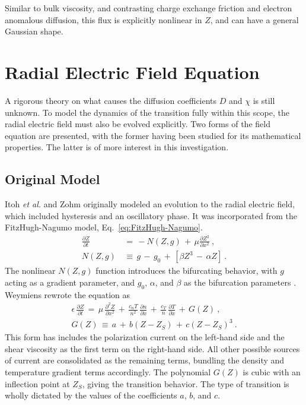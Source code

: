 Similar to bulk viscosity, and contrasting charge exchange friction and electron anomalous diffusion, this flux is explicitly nonlinear in $Z$, and can have a general Gaussian shape.


\section{Radial Electric Field Equation}\label{sec:Z_equation}
A rigorous theory on what causes the diffusion coefficients $D$ and $\chi$ is still unknown.
To model the dynamics of the transition fully within this scope, the radial electric field must also be evolved explicitly.
Two forms of the field equation are presented, with the former having been studied for its mathematical properties. The latter is of more interest in this investigation.

\subsection{Original Model}\label{ssec:original_Z_equation}
Itoh \emph{et al.} \cite{itoh_edge_1991} and Zohm \cite{zohm_dynamic_1994} originally modeled an evolution to the radial electric field, which included hysteresis and an oscillatory phase.
It was incorporated from the FitzHugh-Nagumo model, Eq.~\ref{eq:FitzHugh-Nagumo}.
\begin{align} %
	\frac{\partial Z}{\partial t} \,&=\, -N(Z,g) \,+\, \mu
		\frac{\partial Z^2}{\partial x^2}~,\label{eq:original_z} \\
	N(Z,g) \,&\equiv\, g \,-\, g_0 \,+\, \left[\beta Z^3 \,-\, \alpha Z\right]~.
\end{align}
The nonlinear $N(Z,g)$ function introduces the bifurcating behavior, with $g$ acting as a gradient parameter, and $g_0$, $\alpha$, and $\beta$ as the bifurcation parameters \cite{itoh_model_1988}.
Weymiens \cite{weymiens_bifurcation_2012} rewrote the equation as
\begin{align} %
	\epsilon \, \frac{\partial Z}{\partial t} \,=\, \mu \,
		\frac{\partial^2 Z}{\partial x^2} \,+\, \frac{c_n T}{n^2} \,
		\frac{\partial n}{\partial x} \,+\, \frac{c_T}{n} \,
		\frac{\partial T}{\partial x} \,+\, G(Z)~,\label{eq:original_Z_equation} \\
	G(Z) \,\equiv\, a \,+\, b(Z - Z_S) \,+\, c(Z - Z_S)^3~.
		\label{eq:G_polynomial}
\end{align}
This form has includes the polarization current on the left-hand side and the shear viscosity as the first term on the right-hand side.
All other possible sources of current are consolidated as the remaining terms, bundling the density and temperature gradient terms accordingly.
The polynomial $G(Z)$ is cubic with an inflection point at $Z_S$, giving the transition behavior.
The type of transition is wholly dictated by the values of the coefficients $a$, $b$, and $c$.

